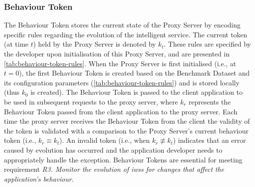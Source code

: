 \subsubsection{Behaviour Token} The Behaviour Token stores the current state of the Proxy Server by encoding specific rules regarding the evolution of the intelligent service. The current token (at time $t$) held by the Proxy Server is denoted by $k_{t}$. These rules are specified by the developer upon initialisation of this Proxy Server, and are presented in \cref{tab:behaviour-token-rules}. When the Proxy Server is first initialised (i.e., at $t = 0$), the first Behaviour Token is created based on the Benchmark Dataset and its configuration parameters (\cref{tab:behaviour-token-rules}) and is stored locally (thus $k_{0}$ is created). The Behaviour Token is passed to the client application to be used in subsequent requests to the proxy server, where $k_{r}$ represents the Behaviour Token passed from the client application to the proxy server. Each time the proxy server receives the Behaviour Token from the client the validity of the token is validated with a comparison to the Proxy Server's current behaviour token (i.e., $k_{r} \equiv k_{t}$). An invalid token (i.e., when $k_{r} \not\equiv k_{t}$)  indicates that an error caused by evolution has occurred and the application developer needs to appropriately handle the exception. Behaviour Tokens are essential for meeting requirement \textit{R3. Monitor the evolution of \glspl{iws} for changes that affect the application’s behaviour.}   


